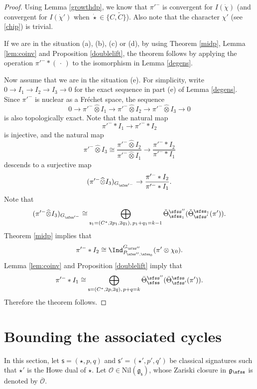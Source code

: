\documentclass[12pt,a4paper]{amsart}
\newcommand{\CO}{{\mathcal {O}}}
\newcommand{\g}{\mathfrak g}
\numberwithin{equation}{section}
\theoremstyle{remark}
\def\Thetab{\bar{\Theta}}
\def\totimes{\widehat{\otimes}}
\begin{document}
\begin{proof}
Using Lemma \ref{growthdp}, we know that $\pi'^-$ is convergent for $I(\dot \chi)$ (and convergent for $I(\dot \chi')$ when $\dot \star\in \{C,\widetilde C\}$). Also note that the character $\chi'$ (see \eqref{chip}) is trivial.

If we are in the situation (a), (b), (c) or (d), by using Theorem \ref{midp}, Lemma \ref{lem:coinv} and Proposition \ref{doublelift}, the theorem follows by applying the operation $\pi'^-*(\,\cdot\,)$ to the isomorphism in Lemma \ref{degens}.

Now assume that we are in the situation (e).
For simplicity, write $0\rightarrow I_1\rightarrow I_2\rightarrow I_3\rightarrow
0$ for the exact sequence in part (e) of Lemma \ref{degens}. Since $\pi'^-$ is nuclear as a Fr\'echet space, the sequence
\[
0\rightarrow \pi'^-\totimes I_1\rightarrow \pi'^-\totimes I_2\rightarrow \pi'^-\totimes I_3\rightarrow
0
\]
is also topologically exact.
Note that the natural map
\[
\pi'^- * I_1\rightarrow \pi'^- * I_2
\]
is injective, and the natural map
\[
  \pi'^-\totimes I_3\cong \frac{\pi'^-\totimes I_2}{\pi'^- \totimes I_1}\longrightarrow\frac{ \pi'^-*I_2}{\pi'^-*I_1}
  \]
descends to a surjective map
\[
  (\pi'^-\totimes  I_3)_{G_{\sfss'^-}}\rightarrow \frac{ \pi'^-*I_2}{\pi'^-*I_1}.
\]
Note that
\[
   (\pi'^-\totimes  I_3)_{G_{\sfss'^-}}\cong \bigoplus_{\mathsf s_1=(C^*, 2p_1, 2q_1), \, p_1+q_1=k-1} \check \Theta^{\sfss''}_{\sfss_1}(\check \Theta^{\sfss_1}_{\sfss'}(\pi')).
\]
Theorem \ref{midp} implies that
\[
\pi'^-*I_2\cong \Ind_{P_{\sfss'',\sfss_0}}^{G_{\sfss''}} (\pi'\otimes \chi_0).
\]
Lemma \ref{lem:coinv} and Proposition \ref{doublelift} imply that
\[
\pi'^-*I_1\cong  \bigoplus_{\mathsf s=(C^*, 2p, 2q), \, p+q=k}  \Thetab^{\sfss''}_{\sfss}(\Thetab^{\sfss}_{\sfss'}(\pi')).
\]
Therefore the theorem follows.
\end{proof}





\section{Bounding the associated  cycles}\label{sec:AC}

In this section, let $\mathsf s=(\star, p,q)$ and $ \mathsf s'=(\star', p',q')$ be classical signatures such that $\star'$ is the Howe dual of $\star$.
Let $\CO\in \mathrm{Nil}(\g_\mathsf s)$, whose Zariski closure in $\g_\sfss$ is denoted by $\overline \CO$.
\end{document}
